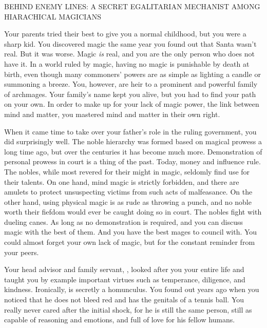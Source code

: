 \documentclass[char]{guildcamp3}
\begin{document}
\name{\cNobleOne{}}





BEHIND ENEMY LINES: A SECRET EGALITARIAN MECHANIST AMONG HIARACHICAL MAGICIANS

Your parents tried their best to give you a normal childhood, but you were a sharp kid. You discovered magic the same year you found out that Santa wasn't real. But it was worse. Magic \emph{is} real, and you are the only person who does not have it. In a world ruled by magic, having no magic is punishable by death at birth, even though many commoners' powers are as simple as lighting a candle or summoning a breeze. You, however, are heir to a prominent and powerful family of archmages. Your family's name kept you alive, but you had to find your path on your own. In order to make up for your lack of magic power, the link between mind and matter, you mastered mind and matter in their own right.

When it came time to take over your father's role in the ruling government, you did surprisingly well. The noble hierarchy was formed based on magical prowess a long time ago, but over the centuries it has become much more. Demonstration of personal prowess in court is a thing of the past. Today, money and influence rule. The nobles, while most revered for their might in magic, seldomly find use for their talents. On one hand, mind magic is strictly forbidden, and there are amulets to protect unsuspecting victims from such acts of malfeasance. On the other hand, using physical magic is as rude as throwing a punch, and no noble worth their fiefdom would ever be caught doing so in court. The nobles fight with dueling canes. As long as no demonstration is required, and you can discuss magic with the best of them. And you have the best mages to council with. You could almost forget your own lack of magic, but for the constant reminder from your peers.

Your head advisor and family servant, , looked after you your entire life and taught you by example important virtues such as temperance, diligence, and kindness. Ironically,  is secretly a homunculus. You found out years ago when you noticed that he does not bleed red and has the genitals of a tennis ball. You really never cared after the initial shock, for he is still the same person, still as capable of reasoning and emotions, and full of love for his fellow humans.
\end{document}
